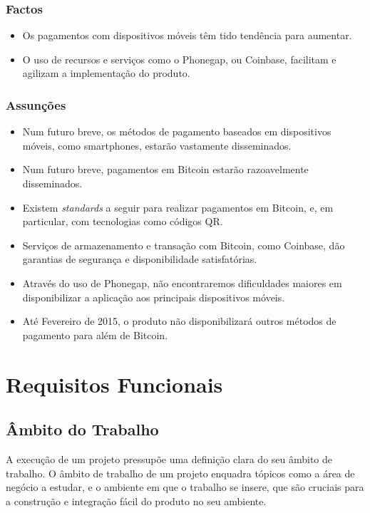 \documentclass[12pt,a4paper]{article}
\begin{document}
    \subsubsection{Factos}
    \begin{itemize}
      \item Os pagamentos com dispositivos móveis têm tido tendência para aumentar.
      \item O uso de recursos e serviços como o Phonegap, ou Coinbase, facilitam e agilizam a implementação do produto.
    \end{itemize}

    \subsubsection{Assunções}
    \begin{itemize}
      \item Num futuro breve, os métodos de pagamento baseados em dispositivos móveis, como smartphones, estarão vastamente disseminados.
      \item Num futuro breve, pagamentos em Bitcoin estarão razoavelmente disseminados.
      \item Existem \emph{standards} a seguir para realizar pagamentos em Bitcoin, e, em particular, com tecnologias como códigos QR.
      \item Serviços de armazenamento e transação com Bitcoin, como Coinbase, dão garantias de segurança e disponibilidade satisfatórias.
      \item Através do uso de Phonegap, não encontraremos dificuldades maiores em disponibilizar a aplicação aos principais dispositivos móveis.
      \item Até Fevereiro de 2015, o produto não disponibilizará outros métodos de pagamento para além de Bitcoin.
    \end{itemize}
\newpage

\section{Requisitos Funcionais}

  \subsection{Âmbito do Trabalho}

    A execução de um projeto pressupõe uma definição clara do seu âmbito de trabalho. O âmbito de trabalho de um projeto enquadra tópicos como a área de negócio a estudar, e o ambiente em que o trabalho se insere, que são cruciais para a construção e integração fácil do produto no seu ambiente.
\end{document}
